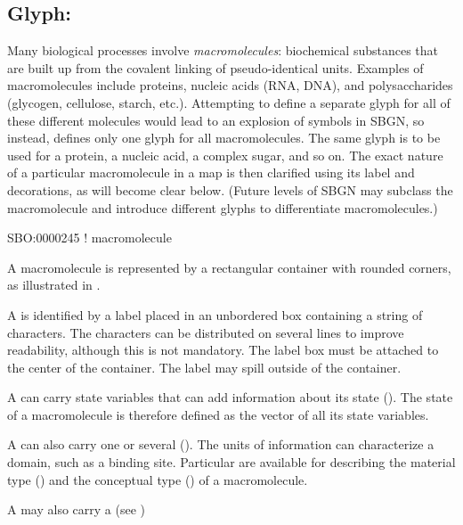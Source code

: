 
\subsection{Glyph: }
\label{sec:macromolecule}

Many biological processes involve \emph{macromolecules}: biochemical substances that are built up from the covalent linking of pseudo-identical units.  Examples of macromolecules include proteins, nucleic acids (RNA, DNA), and polysaccharides (glycogen, cellulose, starch, etc.).  Attempting to define a separate glyph for all of these different molecules would lead to an explosion of symbols in SBGN, so instead, \SBGNPDLone defines only one glyph for all macromolecules.  The same glyph is to be used for a protein, a nucleic acid, a complex sugar, and so on.  The exact nature of a particular macromolecule in a map is then clarified using its label and decorations, as will become clear below.  (Future levels of SBGN may subclass the macromolecule and introduce different glyphs to differentiate macromolecules.)

\begin{glyphDescription}

\glyphSboTerm SBO:0000245 ! macromolecule 

\glyphContainer A macromolecule is represented by a rectangular container with rounded corners, as illustrated in .

\glyphLabel A  is identified by a label placed in an unbordered box containing a string of characters.  The characters can be distributed on several lines to improve readability, although this is not mandatory.  The label box must be attached to the center of the container.  The label may spill outside of the container.

\glyphAux A  can carry state variables that can add information about its state ().  The state of a macromolecule is therefore defined as the vector of all its state variables. 

A  can also carry one or several  ().  The units of information can characterize a domain, such as a binding site.  Particular  are available for describing the material type () and the conceptual type () of a macromolecule.  

A  may also carry a  (see )

\end{glyphDescription}

